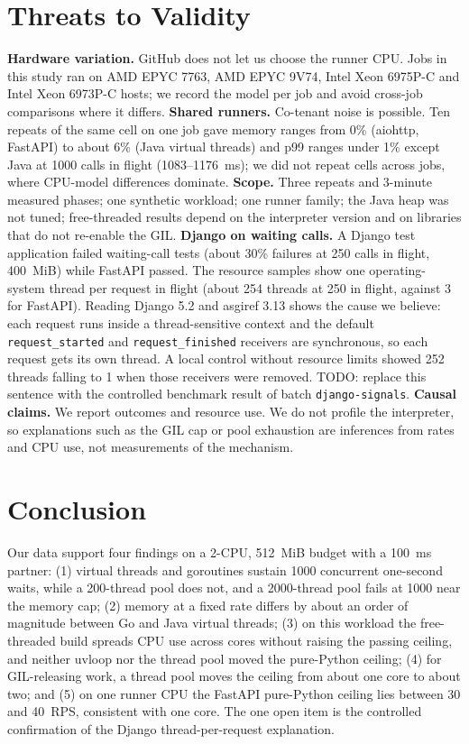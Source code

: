 \documentclass[journal]{IEEEtran}
\begin{document}
\section{Threats to Validity}\label{sec:threats}
\textbf{Hardware variation.} GitHub does not let us choose the runner CPU. Jobs in this study ran on AMD EPYC 7763, AMD EPYC 9V74, Intel Xeon 6975P-C and Intel Xeon 6973P-C hosts; we record the model per job and avoid cross-job comparisons where it differs. \textbf{Shared runners.} Co-tenant noise is possible. Ten repeats of the same cell on one job gave memory ranges from 0\% (aiohttp, FastAPI) to about 6\% (Java virtual threads) and p99 ranges under 1\% except Java at 1000 calls in flight (1083--1176~ms); we did not repeat cells across jobs, where CPU-model differences dominate. \textbf{Scope.} Three repeats and 3-minute measured phases; one synthetic workload; one runner family; the Java heap was not tuned; free-threaded results depend on the interpreter version and on libraries that do not re-enable the GIL. \textbf{Django on waiting calls.} A Django test application failed waiting-call tests (about 30\% failures at 250 calls in flight, 400~MiB) while FastAPI passed. The resource samples show one operating-system thread per request in flight (about 254 threads at 250 in flight, against 3 for FastAPI). Reading Django 5.2 and asgiref 3.13 shows the cause we believe: each request runs inside a thread-sensitive context and the default \texttt{request\_started} and \texttt{request\_finished} receivers are synchronous, so each request gets its own thread. A local control without resource limits showed 252 threads falling to 1 when those receivers were removed. TODO: replace this sentence with the controlled benchmark result of batch \texttt{django-signals}. \textbf{Causal claims.} We report outcomes and resource use. We do not profile the interpreter, so explanations such as the GIL cap or pool exhaustion are inferences from rates and CPU use, not measurements of the mechanism.

\section{Conclusion}
Our data support four findings on a 2-CPU, 512~MiB budget with a 100~ms partner: (1) virtual threads and goroutines sustain 1000 concurrent one-second waits, while a 200-thread pool does not, and a 2000-thread pool fails at 1000 near the memory cap; (2) memory at a fixed rate differs by about an order of magnitude between Go and Java virtual threads; (3) on this workload the free-threaded build spreads CPU use across cores without raising the passing ceiling, and neither uvloop nor the thread pool moved the pure-Python ceiling; (4) for GIL-releasing work, a thread pool moves the ceiling from about one core to about two; and (5) on one runner CPU the FastAPI pure-Python ceiling lies between 30 and 40~RPS, consistent with one core. The one open item is the controlled confirmation of the Django thread-per-request explanation.
\end{document}

